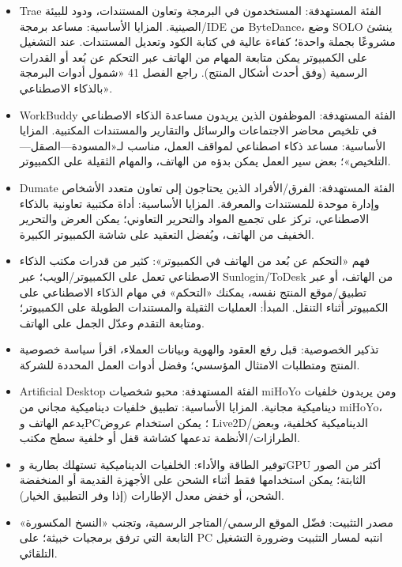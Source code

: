 
\begin{itemize}
  \item Trae الفئة المستهدفة: المستخدمون في البرمجة وتعاون المستندات، ودود للبيئة الصينية. المزايا الأساسية: مساعد برمجة/IDE من ByteDance، وضع SOLO ينشئ مشروعًا بجملة واحدة؛ كفاءة عالية في كتابة الكود وتعديل المستندات. عند التشغيل على الكمبيوتر يمكن متابعة المهام من الهاتف عبر التحكم عن بُعد أو القدرات الرسمية (وفق أحدث أشكال المنتج). راجع الفصل 41 «شمول أدوات البرمجة بالذكاء الاصطناعي».
  \item WorkBuddy الفئة المستهدفة: الموظفون الذين يريدون مساعدة الذكاء الاصطناعي في تلخيص محاضر الاجتماعات والرسائل والتقارير والمستندات المكتبية. المزايا الأساسية: مساعد ذكاء اصطناعي لمواقف العمل، مناسب لـ«المسودة—الصقل—التلخيص»؛ بعض سير العمل يمكن بدؤه من الهاتف، والمهام الثقيلة على الكمبيوتر.
  \item Dumate الفئة المستهدفة: الفرق/الأفراد الذين يحتاجون إلى تعاون متعدد الأشخاص وإدارة موحدة للمستندات والمعرفة. المزايا الأساسية: أداة مكتبية تعاونية بالذكاء الاصطناعي، تركز على تجميع المواد والتحرير التعاوني؛ يمكن العرض والتحرير الخفيف من الهاتف، ويُفضل التعقيد على شاشة الكمبيوتر الكبيرة.
  \item فهم «التحكم عن بُعد من الهاتف في الكمبيوتر»: كثير من قدرات مكتب الذكاء الاصطناعي تعمل على الكمبيوتر/الويب؛ عبر Sunlogin/ToDesk من الهاتف، أو عبر تطبيق/موقع المنتج نفسه، يمكنك «التحكم» في مهام الذكاء الاصطناعي على الكمبيوتر أثناء التنقل. المبدأ: العمليات الثقيلة والمستندات الطويلة على الكمبيوتر؛ ومتابعة التقدم وعدّل الجمل على الهاتف.
  \item تذكير الخصوصية: قبل رفع العقود والهوية وبيانات العملاء، اقرأ سياسة خصوصية المنتج ومتطلبات الامتثال المؤسسي؛ وفضل أدوات العمل المحددة للشركة.
\end{itemize}


\begin{itemize}
  \item Artificial Desktop الفئة المستهدفة: محبو شخصيات miHoYo ومن يريدون خلفيات ديناميكية مجانية. المزايا الأساسية: تطبيق خلفيات ديناميكية مجاني من miHoYo، يدعم الهاتف وPC؛ يمكن استخدام عروض Live2D/الديناميكية كخلفية، وبعض الطرازات/الأنظمة تدعمها كشاشة قفل أو خلفية سطح مكتب.
  \item توفير الطاقة والأداء: الخلفيات الديناميكية تستهلك بطارية وGPU أكثر من الصور الثابتة؛ يمكن استخدامها فقط أثناء الشحن على الأجهزة القديمة أو المنخفضة الشحن، أو خفض معدل الإطارات (إذا وفر التطبيق الخيار).
  \item مصدر التثبيت: فضّل الموقع الرسمي/المتاجر الرسمية، وتجنب «النسخ المكسورة» التابعة التي ترفق برمجيات خبيثة؛ على PC انتبه لمسار التثبيت وضرورة التشغيل التلقائي.
\end{itemize}

